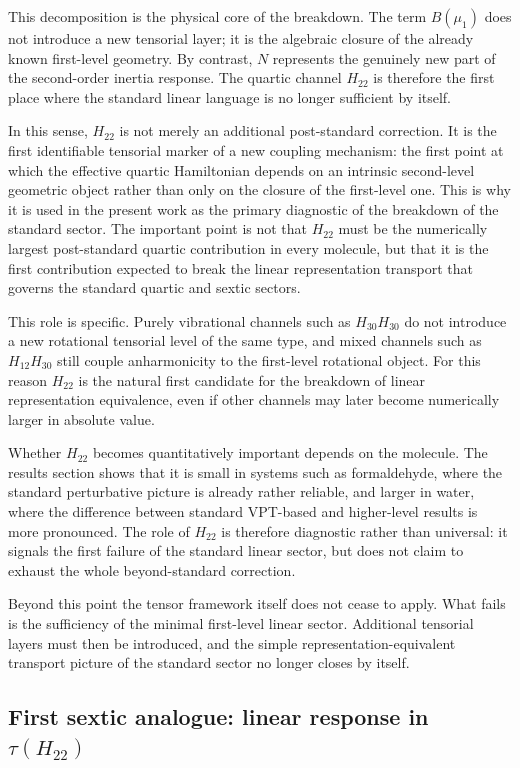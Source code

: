 \documentclass[journal=jacsat,manuscript=article]{achemso}
\begin{document}
This decomposition is the physical core of the breakdown. The term
$B(\mu_1)$ does not introduce a new tensorial layer; it is the
algebraic closure of the already known first-level geometry. By
contrast, $N$ represents the genuinely new part of the second-order
inertia response. The quartic channel $H_{22}$ is therefore the first
place where the standard linear language is no longer sufficient by
itself.

In this sense, $H_{22}$ is not merely an additional post-standard
correction. It is the first identifiable tensorial marker of a new
coupling mechanism: the first point at which the effective quartic
Hamiltonian depends on an intrinsic second-level geometric object
rather than only on the closure of the first-level one. This is why
it is used in the present work as the primary diagnostic of the
breakdown of the standard sector. The important point is not that
$H_{22}$ must be the numerically largest post-standard quartic
contribution in every molecule, but that it is the first contribution
expected to break the linear representation transport that governs the
standard quartic and sextic sectors.

This role is specific. Purely vibrational channels such as
$H_{30}H_{30}$ do not introduce a new rotational tensorial level of
the same type, and mixed channels such as $H_{12}H_{30}$ still couple
anharmonicity to the first-level rotational object. For this reason
$H_{22}$ is the natural first candidate for the breakdown of linear
representation equivalence, even if other channels may later become
numerically larger in absolute value.

Whether $H_{22}$ becomes quantitatively important depends on the
molecule. The results section shows that it is small in systems such
as formaldehyde, where the standard perturbative picture is already
rather reliable, and larger in water, where the difference between
standard VPT-based and higher-level results is more pronounced. The
role of $H_{22}$ is therefore diagnostic rather than universal: it
signals the first failure of the standard linear sector, but does not
claim to exhaust the whole beyond-standard correction.

Beyond this point the tensor framework itself does not cease to apply.
What fails is the sufficiency of the minimal first-level linear sector.
Additional tensorial layers must then be introduced, and the simple
representation-equivalent transport picture of the standard sector no
longer closes by itself.

\subsection{First sextic analogue: linear response in \texorpdfstring{$\tau(H_{22})$}{tau(H22)}}
\end{document}
